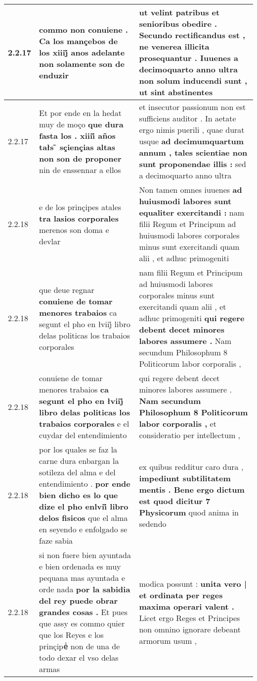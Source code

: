 \begin{tabular}{|p{1cm}|p{6.5cm}|p{6.5cm}|}
2.2.17 & commo non conuiene . \textbf{ Ca los mançebos de los xiiij̊ anos adelante } non solamente son de enduzir & ut velint patribus et senioribus obedire . Secundo rectificandus est , \textbf{ ne venerea illicita prosequantur . Iuuenes a decimoquarto anno ultra non solum inducendi sunt , } ut sint abstinentes \\\hline
2.2.17 & Et por ende en la hedat muy de moço \textbf{ que dura fasta los . xiiii̊ años tałs ̃ sçiençias altas non son de proponer } nin de enssennar a ellos & et insecutor passionum non est sufficiens auditor . In aetate ergo nimis puerili , quae durat usque \textbf{ ad decimumquartum annum , tales scientiae non sunt proponendae illis : } sed a decimoquarto anno ultra \\\hline
2.2.18 & e de los prinçipes atales \textbf{ tra lasios corporales } merenos son doma e devlar & Non tamen omnes iuuenes \textbf{ ad huiusmodi labores sunt equaliter exercitandi : } nam filii Regum et Principum ad huiusmodi labores corporales minus sunt exercitandi quam alii , et adhuc primogeniti \\\hline
2.2.18 & que deue regnar \textbf{ conuiene de tomar menores trabaios } ca segunt el pho en łviij̊ libro delas politicas los trabaios corporales & nam filii Regum et Principum ad huiusmodi labores corporales minus sunt exercitandi quam alii , et adhuc primogeniti \textbf{ qui regere debent decet minores labores assumere . } Nam secundum Philosophum 8 Politicorum labor corporalis , \\\hline
2.2.18 & conuiene de tomar menores trabaios \textbf{ ca segunt el pho en łviij̊ libro delas politicas los trabaios corporales } e el cuydar del entendimiento & qui regere debent decet minores labores assumere . \textbf{ Nam secundum Philosophum 8 Politicorum labor corporalis , } et consideratio per intellectum , \\\hline
2.2.18 & por los quales se faz la carne dura enbargan la sotileza del alma e del entendimiento . \textbf{ por ende bien dicho es lo que dize el pho enlvii̊ libro delos fisicos } que el alma en seyendo e enfolgado se faze sabia & ex quibus redditur caro dura , \textbf{ impediunt subtilitatem mentis . Bene ergo dictum est quod dicitur 7 Physicorum } quod anima in sedendo \\\hline
2.2.18 & si non fuere bien ayuntada e bien ordenada es muy pequana mas ayuntada e orde nada \textbf{ por la sabidia del rey puede obrar grandes cosas . } Et pues que assy es commo quier que los Reyes e los prinçipeᷤ non de una de todo dexar el vso delas armas & modica possunt : \textbf{ unita vero | et ordinata per reges maxima operari valent . } Licet ergo Reges et Principes non omnino ignorare debeant armorum usum , \\\hline

\end{tabular}
